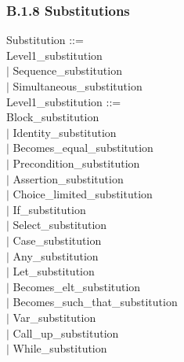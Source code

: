 \documentclass[12pt,a4paper,draft]{report}
\begin{document}
{\begin{sloppypar}
\subsubsection{B.1.8 Substitutions }
Substitution ::= \\ 
   Level1\_substitution\\ 
\hspace*{0.20in} $|$  Sequence\_substitution\\ 
\hspace*{0.20in} $|$  Simultaneous\_substitution\\ 
Level1\_substitution ::= \\ 
   Block\_substitution\\ 
\hspace*{0.20in} $|$  Identity\_substitution\\ 
\hspace*{0.20in} $|$  Becomes\_equal\_substitution\\ 
\hspace*{0.20in} $|$  Precondition\_substitution\\ 
\hspace*{0.20in} $|$  Assertion\_substitution\\ 
\hspace*{0.20in} $|$  Choice\_limited\_substitution\\ 
\hspace*{0.20in} $|$  If\_substitution\\ 
\hspace*{0.20in} $|$  Select\_substitution\\ 
\hspace*{0.20in} $|$  Case\_substitution\\ 
\hspace*{0.20in} $|$  Any\_substitution\\ 
\hspace*{0.20in} $|$  Let\_substitution\\ 
\hspace*{0.20in} $|$  Becomes\_elt\_substitution\\ 
\hspace*{0.20in} $|$  Becomes\_such\_that\_substitution\\ 
\hspace*{0.20in} $|$  Var\_substitution\\ 
\hspace*{0.20in} $|$  Call\_up\_substitution\\ 
\hspace*{0.20in} $|$  While\_substitution\\ 

\end{sloppypar}}
\end{document}
